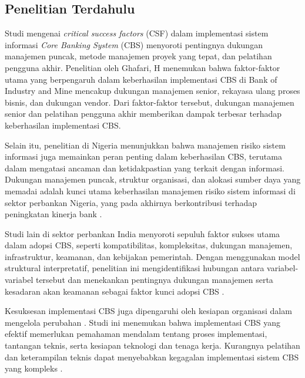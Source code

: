 \documentclass[journal,article,submit,pdftex,moreauthors]{Definitions/mdpi}
\begin{document}
\subsection{Penelitian Terdahulu} \label{sec:Penelitian Terdahulu}

Studi mengenai \textit{critical success factors} (CSF) dalam implementasi sistem informasi \textit{Core Banking System} (CBS) menyoroti pentingnya dukungan manajemen puncak, metode manajemen proyek yang tepat, dan pelatihan pengguna akhir. Penelitian oleh Ghafari, H \cite{Ghafari-csf} menemukan bahwa faktor-faktor utama yang berpengaruh dalam keberhasilan implementasi CBS di Bank of Industry and Mine mencakup dukungan manajemen senior, rekayasa ulang proses bisnis, dan dukungan vendor. Dari faktor-faktor tersebut, dukungan manajemen senior dan pelatihan pengguna akhir memberikan dampak terbesar terhadap keberhasilan implementasi CBS.

Selain itu, penelitian di Nigeria menunjukkan bahwa manajemen risiko sistem informasi juga memainkan peran penting dalam keberhasilan CBS, terutama dalam mengatasi ancaman dan ketidakpastian yang terkait dengan informasi. Dukungan manajemen puncak, struktur organisasi, dan alokasi sumber daya yang memadai adalah kunci utama keberhasilan manajemen risiko sistem informasi di sektor perbankan Nigeria, yang pada akhirnya berkontribusi terhadap peningkatan kinerja bank \cite{falisat-csf}.

Studi lain \cite{salu-csf} di sektor perbankan India menyoroti sepuluh faktor sukses utama dalam adopsi CBS, seperti kompatibilitas, kompleksitas, dukungan manajemen, infrastruktur, keamanan, dan kebijakan pemerintah. Dengan menggunakan model struktural interpretatif, penelitian ini mengidentifikasi hubungan antara variabel-variabel tersebut dan menekankan pentingnya dukungan manajemen serta kesadaran akan keamanan sebagai faktor kunci adopsi CBS \cite{salu-csf}.

Kesuksesan implementasi CBS juga dipengaruhi oleh kesiapan organisasi dalam mengelola perubahan \cite{johny-csf}. Studi ini menemukan bahwa implementasi CBS yang efektif memerlukan pemahaman mendalam tentang proses implementasi, tantangan teknis, serta kesiapan teknologi dan tenaga kerja. Kurangnya pelatihan dan keterampilan teknis dapat menyebabkan kegagalan implementasi sistem CBS yang kompleks \cite{johny-csf}.
\end{document}
